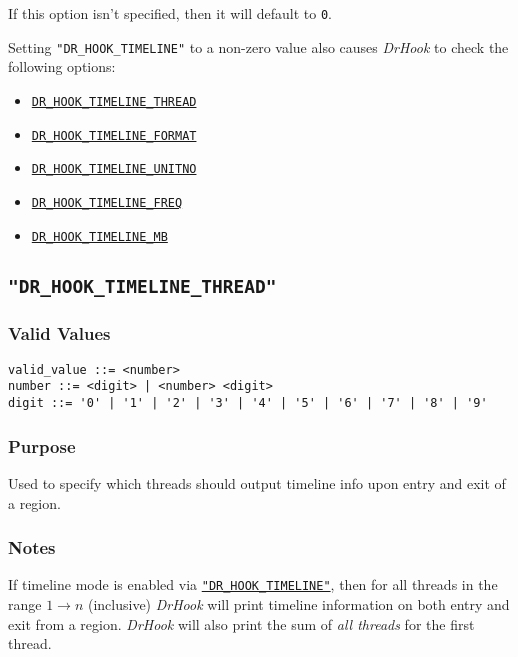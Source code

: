 If this option isn't specified, then it will default to \verb|0|.

Setting \texttt{"DR\_HOOK\_TIMELINE"} to a non-zero value also causes \textit{DrHook} to check the following options:
\begin{itemize}
    \item \hyperref[section:flags:DR_HOOK_TIMELINE_THREAD]{\texttt{DR\_HOOK\_TIMELINE\_THREAD}}
    \item \hyperref[section:flags:DR_HOOK_TIMELINE_FORMAT]{\texttt{DR\_HOOK\_TIMELINE\_FORMAT}}
    \item \hyperref[section:flags:DR_HOOK_TIMELINE_UNITNO]{\texttt{DR\_HOOK\_TIMELINE\_UNITNO}}
    \item \hyperref[section:flags:DR_HOOK_TIMELINE_FREQ]{\texttt{DR\_HOOK\_TIMELINE\_FREQ}}
    \item \hyperref[section:flags:DR_HOOK_TIMELINE_MB]{\texttt{DR\_HOOK\_TIMELINE\_MB}}
\end{itemize}



\subsection{\texttt{"DR\_HOOK\_TIMELINE\_THREAD"}}
\label{section:flags:DR_HOOK_TIMELINE_THREAD}
\vspace{-2ex}
\subsubsection{Valid Values}
\vspace{-2ex}
\verb+valid_value ::= <number>+ \\
\verb+number ::= <digit> | <number> <digit>+ \\
\verb+digit ::= '0' | '1' | '2' | '3' | '4' | '5' | '6' | '7' | '8' | '9'+

\vspace{-2ex}
\subsubsection{Purpose}
\vspace{-2ex}
Used to specify which threads should output timeline info upon entry and exit of a region.


\vspace{-2ex}
\subsubsection{Notes}
\vspace{-2ex}
If timeline mode is enabled via \hyperref[section:flags:DR_HOOK_TIMELINE]{\texttt{"DR\_HOOK\_TIMELINE"}}, then for all threads in the range $1 \rightarrow n$ (inclusive) \textit{DrHook} will print timeline information on both entry and exit from a region. \textit{DrHook} will also print the sum of \textit{all threads} for the first thread.

